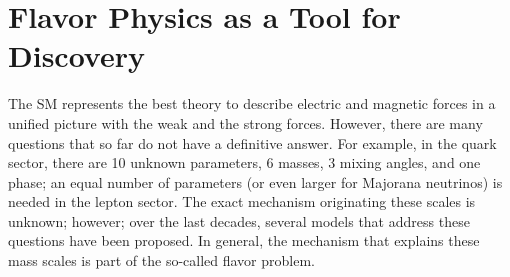\documentclass[a4paper,11pt]{article}
\begin{document}
\section{Flavor Physics as a Tool for Discovery}
The SM represents the best theory to describe electric and magnetic forces in a unified picture with the weak and the strong forces. However, there are many questions that so far do not have a definitive answer.  For example, in the quark sector, there are 10 unknown parameters, 6 masses, 3 mixing angles, and one phase; an equal number of parameters (or even larger for Majorana neutrinos) is needed in the lepton sector. The exact mechanism originating these scales is unknown; however; over the last decades, several models that address these questions have been proposed. In general, the mechanism that explains these mass scales is part of the so-called flavor problem.
%
\end{document}
